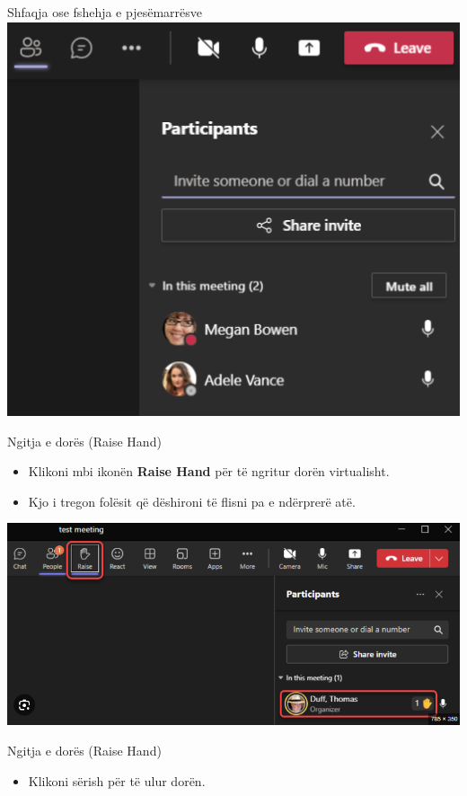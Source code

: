 \documentclass[
  ignorenonframetext,
]{beamer}
\providecommand{\tightlist}{%
  \setlength{\itemsep}{0pt}\setlength{\parskip}{0pt}}
\begin{document}
\begin{frame}{Shfaqja ose fshehja e pjesëmarrësve}
\label{shfaqja-ose-fshehja-e-pjesuxebmarruxebsve-1}
\includegraphics{./images/teams10.png}
\end{frame}

\begin{frame}{Ngitja e dorës (Raise Hand)}
\label{ngitja-e-doruxebs-raise-hand}
\begin{itemize}
\item
  Klikoni mbi ikonën \textbf{Raise Hand} për të ngritur dorën
  virtualisht.
\item
  Kjo i tregon folësit që dëshironi të flisni pa e ndërprerë atë.
\end{itemize}

\includegraphics{./images/teams11.png}
\end{frame}

\begin{frame}{Ngitja e dorës (Raise Hand)}
\label{ngitja-e-doruxebs-raise-hand-1}
\begin{itemize}
\tightlist
\item
  Klikoni sërish për të ulur dorën.
\end{itemize}
\end{frame}
\end{document}
